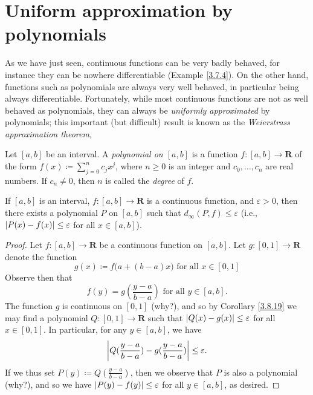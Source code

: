 \section{Uniform approximation by polynomials}\label{sec 3.8}

\begin{note}
    As we have just seen, continuous functions can be very badly behaved, for instance they can be nowhere differentiable (Example \ref{3.7.4}).
    On the other hand, functions such as polynomials are always very well behaved, in particular being always differentiable.
    Fortunately, while most continuous functions are not as well behaved as polynomials, they can always be \emph{uniformly approximated} by polynomials; this important (but difficult) result is known as the \emph{Weierstrass approximation theorem},
\end{note}

\begin{definition}\label{3.8.1}
    Let \([a, b]\) be an interval.
    A \emph{polynomial on \([a, b]\)} is a
    function \(f : [a, b] \to \mathbf{R}\) of the form \(f(x) \coloneqq \sum_{j = 0}^n c_j x^j\), where \(n \geq 0\) is an integer and \(c_0, \dots, c_n\) are real numbers.
    If \(c_n \neq 0\), then \(n\) is called the \emph{degree} of \(f\).
\end{definition}

\setcounter{theorem}{2}
\begin{theorem}\label{3.8.3}
    If \([a, b]\) is an interval, \(f : [a, b] \to \mathbf{R}\) is a continuous function, and \(\varepsilon > 0\), then there exists a polynomial \(P\) on \([a, b]\) such that \(d_\infty(P, f) \leq \varepsilon\)
    (i.e., \(\abs*{P(x) - f(x)} \leq \varepsilon\) for all \(x \in [a, b]\)).
\end{theorem}

\begin{proof}
    Let \(f : [a, b] \to \mathbf{R}\) be a continuous function on \([a, b]\).
    Let \(g : [0, 1] \to \mathbf{R}\) denote the function
    \[
        g(x) \coloneqq f\big(a + (b - a) x\big) \text{ for all } x \in [0, 1]
    \]
    Observe then that
    \[
        f(y) = g(\frac{y - a}{b - a}) \text{ for all } y \in [a, b].
    \]
    The function \(g\) is continuous on \([0, 1]\) (why?), and so by Corollary \ref{3.8.19} we may find a polynomial \(Q : [0, 1] \to \mathbf{R}\) such that \(\abs*{Q(x) - g(x)} \leq \varepsilon\) for all \(x \in [0, 1]\).
    In particular, for any \(y \in [a, b]\), we have
    \[
        \abs*{Q(\frac{y - a}{b - a}) - g(\frac{y - a}{b - a})} \leq \varepsilon.
    \]
    If we thus set \(P(y) \coloneqq Q(\frac{y - a}{b - a})\), then we observe that \(P\) is also a polynomial (why?), and so we have \(\abs*{P(y) - f(y)} \leq \varepsilon\) for all \(y \in [a, b]\), as desired.
\end{proof}


